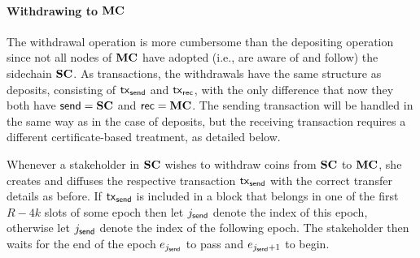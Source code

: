 \paragraph{Withdrawing to $\mathbf{MC}$}

The withdrawal operation is more cumbersome than the depositing
operation since not all nodes of $\mathbf{MC}$ have adopted (i.e., are aware of and follow) the
sidechain $\mathbf{SC}$.
As transactions, the withdrawals have the same structure as deposits, consisting
of $\mathsf{tx}_{\mathsf{send}}$ and $\mathsf{tx}_{\mathsf{rec}}$, with the only difference
that now they both have $\mathsf{send}=\mathbf{SC}$ and $\mathsf{rec}=\mathbf{MC}$.
The sending transaction will be handled in the same way as in the case of
deposits, but the receiving transaction requires a different certificate-based
treatment, as detailed below.

    Whenever a stakeholder in $\mathbf{SC}$ wishes to withdraw coins from $\mathbf{SC}$
    to $\mathbf{MC}$, she creates and diffuses the respective transaction $\mathsf{tx}_{\mathsf{send}}$
    with the correct transfer details as before.
    If $\mathsf{tx}_{\mathsf{send}}$ is included in a block that belongs in one of the first
    $R-4k$ slots of some epoch then let $j_{\mathsf{send}}$ denote the index of this epoch,
    otherwise let $j_{\mathsf{send}}$ denote the index of the following epoch.
    The stakeholder then waits for the end of the epoch $e_{j_{\mathsf{send}}}$ to pass and
    $e_{j_{\mathsf{send}}+1}$ to begin.

